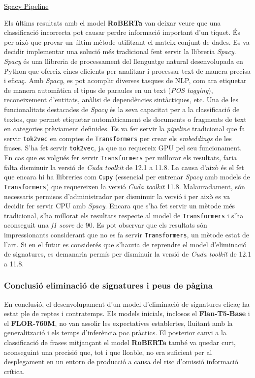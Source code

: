 \underline{Spacy Pipeline}

Els últims resultats amb el model \textbf{RoBERTa} van deixar veure que una classificació incorrecta pot causar perdre informació important d'un tiquet. És per això que provar un últim mètode utilitzant el mateix conjunt de dades. Es va decidir implementar una solució més tradicional fent servir la llibreria \textit{Spacy}.
\textit{Spacy} és una llibreria de processament del llenguatge natural desenvolupada en Python que ofereix eines eficients per analitzar i processar text de manera precisa i eficaç. Amb \textit{Spacy}, es pot acomplir diverses tasques de NLP, com ara etiquetar de manera automàtica el tipus de paraules en un text (\textit{POS tagging}), reconeixement d'entitats, anàlisi de dependències sintàctiques, etc. Una de les funcionalitats destacades de \textit{Spacy} és la seva capacitat per a la classificació de textos, que permet etiquetar automàticament els documents o fragments de text en categories prèviament definides.
Es va fer servir la \textit{pipeline} tradicional que fa servir \texttt{tok2vec} en comptes de \texttt{Transformers} per crear els \textit{embeddings} de les frases. S'ha fet servir \texttt{tok2vec}, ja que no requereix GPU pel seu funcionament. En cas que es volgués fer servir \texttt{Transformers} per millorar els resultats, faria falta disminuir la versió de \textit{Cuda toolkit} de 12.1 a 11.8. La causa d'això és el fet que encara hi ha llibreries com \texttt{Cupy} (essencial per entrenar \textit{Spacy} amb models de \texttt{Transformers}) que requereixen la versió \textit{Cuda toolkit} 11.8. Malauradament, són necessaris permisos d'administrador per disminuir la versió i per això es va decidir fer servir CPU amb \textit{Spacy}.
Encara que s'ha fet servir un mètode més tradicional, s'ha millorat els resultats respecte al model de \texttt{Transformers} i s'ha aconseguit una \textit{f1 score} de 90. Es pot observar que els resultats són impressionants considerant que no es fa servir \texttt{Transformers}, un mètode estat de l'art. Si en el futur es considerés que s'hauria de reprendre el model d'eliminació de signatures, es demanaria permís per disminuir la versió de \textit{Cuda toolkit} de 12.1 a 11.8.

\subsubsection{Conclusió eliminació de signatures i peus de pàgina}
En conclusió, el desenvolupament d'un model d'eliminació de signatures eficaç ha estat ple de reptes i contratemps. Els models inicials, inclosos el \textbf{Flan-T5-Base} i el \textbf{FLOR-760M}, no van assolir les expectatives establertes, lluitant amb la generalització i els temps d'inferència poc pràctics. El posterior canvi a la classificació de frases mitjançant el model \textbf{RoBERTa} també va quedar curt, aconseguint una precisió que, tot i que lloable, no era suficient per al desplegament en un entorn de producció a causa del risc d'omissió informació crítica.

